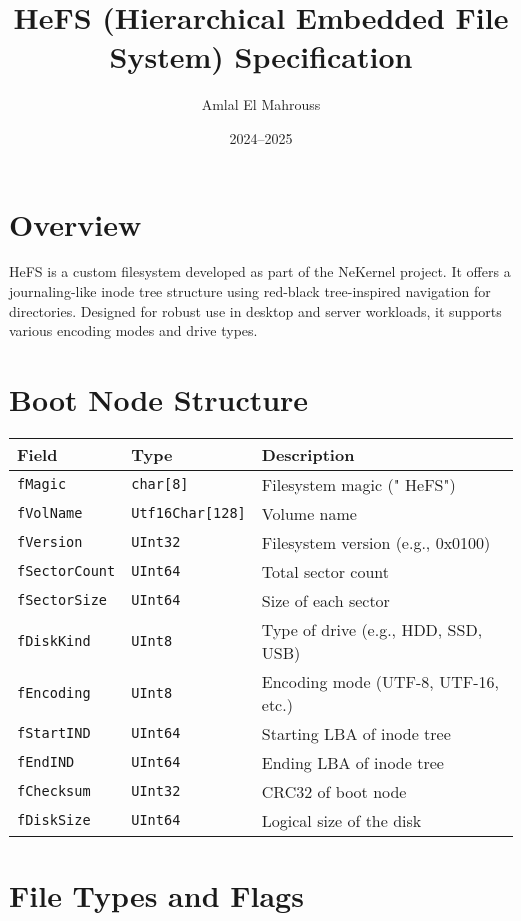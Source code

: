 \documentclass{article}
\title{HeFS (Hierarchical Embedded File System) Specification}
\author{Amlal El Mahrouss}
\date{2024–2025}
\begin{document}
\maketitle

\section{Overview}
HeFS is a custom filesystem developed as part of the NeKernel project. It offers a journaling-like inode tree structure using red-black tree-inspired navigation for directories. Designed for robust use in desktop and server workloads, it supports various encoding modes and drive types.

\section{Boot Node Structure}
\begin{longtable}{|l|l|p{8cm}|}
\hline
\textbf{Field} & \textbf{Type} & \textbf{Description} \\
\hline
\verb|fMagic| & \verb|char[8]| & Filesystem magic ("  HeFS") \\
\verb|fVolName| & \verb|Utf16Char[128]| & Volume name \\
\verb|fVersion| & \verb|UInt32| & Filesystem version (e.g., 0x0100) \\
\verb|fSectorCount| & \verb|UInt64| & Total sector count \\
\verb|fSectorSize| & \verb|UInt64| & Size of each sector \\
\verb|fDiskKind| & \verb|UInt8| & Type of drive (e.g., HDD, SSD, USB) \\
\verb|fEncoding| & \verb|UInt8| & Encoding mode (UTF-8, UTF-16, etc.) \\
\verb|fStartIND| & \verb|UInt64| & Starting LBA of inode tree \\
\verb|fEndIND| & \verb|UInt64| & Ending LBA of inode tree \\
\verb|fChecksum| & \verb|UInt32| & CRC32 of boot node \\
\verb|fDiskSize| & \verb|UInt64| & Logical size of the disk \\
\hline
\end{longtable}

\section{File Types and Flags}
\end{document}
